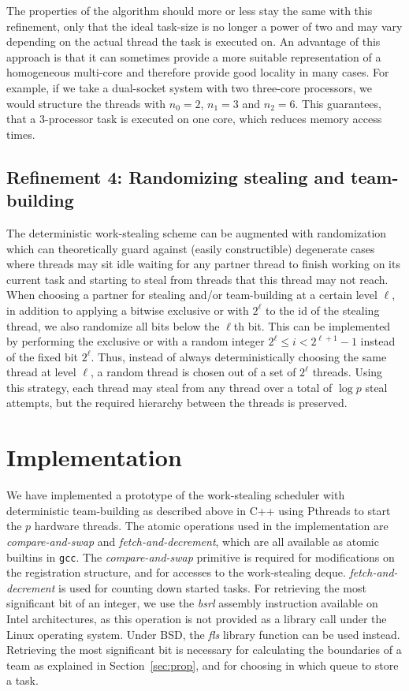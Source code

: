\documentclass[preprint]{sigplanconf}
\begin{document}
The properties of the algorithm should more or less stay the same with
this refinement, only that the ideal task-size is no longer a power of
two and may vary depending on the actual thread the task is executed
on. An advantage of this approach is that it can sometimes provide a
more suitable representation of a homogeneous multi-core and therefore
provide good locality in many cases. For example, if we take a
dual-socket system with two three-core processors, we would structure
the threads with $n_{0}=2$, $n_{1}=3$ and $n_{2}=6$. This guarantees,
that a 3-processor task is executed on one core, which reduces memory
access times.

\subsection{Refinement 4: Randomizing stealing and team-building}

The deterministic work-stealing scheme can be augmented with
randomization which can theoretically guard against (easily
constructible) degenerate cases where threads may sit idle waiting for
any partner thread to finish working on its current task and starting
to steal from threads that this thread may not reach. When choosing a
partner for stealing and/or team-building at a certain level $\ell$,
in addition to applying a bitwise exclusive or with $2^{\ell}$ to the
id of the stealing thread, we also randomize all bits below the
$\ell$th bit. This can be implemented by performing the exclusive or
with a random integer $2^{\ell}\leq i<2^{\ell+1}-1$ instead of the
fixed bit $2^{\ell}$.  Thus, instead of always deterministically
choosing the same thread at level $\ell$, a random thread is chosen
out of a set of $2^{\ell}$ threads. Using this strategy, each thread
may steal from any thread over a total of $\log p$ steal attempts, but
the required hierarchy between the threads is preserved.

\section{Implementation}
\label{sec:implementation}

We have implemented a prototype of the work-stealing scheduler with
deterministic team-building as described above in C++ using Pthreads
to start the $p$ hardware threads.  The atomic operations used in the
implementation are \emph{compare-and-swap} and
\emph{fetch-and-decrement}, which are all available as atomic builtins
in \texttt{gcc}. The \emph{compare-and-swap} primitive is required for
modifications on the registration structure, and for accesses to the
work-stealing deque. \emph{fetch-and-decrement} is used for counting
down started tasks. For retrieving the most significant bit of an
integer, we use the \emph{bsrl} assembly instruction available on
Intel architectures, as this operation is not provided as a library
call under the Linux operating system. Under BSD, the
\emph{fls} library function can be used instead. Retrieving the most
significant bit is necessary for calculating the boundaries of a team
as explained in Section~\ref{sec:prop}, and for choosing in which
queue to store a task.
\end{document}
